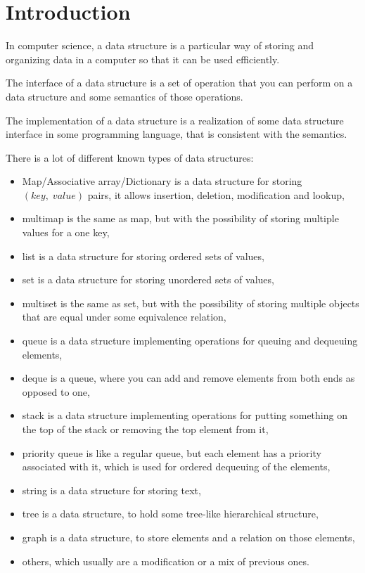 \documentclass[a4paper,11pt]{article}
\begin{document}
\tableofcontents

\vfill

\section{Introduction} \label{sec:intro}
	In computer science, a data structure is a particular way of storing and organizing data in a computer so that
	it can be used efficiently\cite{Wids}.

	The interface of a data structure is a set of operation that you can perform on a data structure and some
	semantics of those operations.

	The implementation of a data structure is a realization of some data structure interface in some programming
	language, that is consistent with the semantics.

	There is a lot of different known types of data structures:
	\begin{itemize}
		\item Map/Associative array/Dictionary is a data structure for storing $(key,\;value)$ pairs, it allows
			insertion, deletion, modification and lookup,
		\item multimap is the same as map, but with the possibility of storing multiple values for a one key,
		\item list is a data structure for storing ordered sets of values,
		\item set is a data structure for storing unordered sets of values,
		\item multiset is the same as set, but with the possibility of storing multiple objects that are equal
			under some equivalence relation,
		\item queue is a data structure implementing operations for queuing and dequeuing elements,
		\item deque is a queue, where you can add and remove elements from both ends as opposed to one,
		\item stack is a data structure implementing operations for putting something on the top of the stack or
			removing the top element from it,
		\item priority queue is like a regular queue, but each element has a priority associated with it, which
			is used for ordered dequeuing of the elements,
		\item string is a data structure for storing text,
		\item tree is a data structure, to hold some tree-like hierarchical structure,
		\item graph is a data structure, to store elements and a relation on those elements,
		\item others, which usually are a modification or a mix of previous ones.
	\end{itemize}
\end{document}
